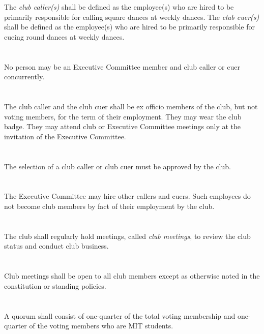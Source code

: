 \documentclass{bylaws}
\begin{document}
\section{}The \textit{club caller(s)} shall be defined as the employee(s) who are hired to be primarily responsible for calling square dances at weekly dances. The \textit{club cuer(s)} shall be defined as the employee(s) who are hired to be primarily responsible for cueing round dances at weekly dances.
\section{}No person may be an Executive Committee member and club caller or cuer concurrently.
\section{}The club caller and the club cuer shall be ex officio members of the club, but not voting members, for the term of their employment.  They may wear the club badge.  They may attend club or Executive Committee meetings only at the invitation of the Executive Committee.
\section{}The selection of a club caller or club cuer must be approved by the club.
\section{}The Executive Committee may hire other callers and cuers.  Such employees do not become club members by fact of their employment by the club.


\section{}The club shall regularly hold meetings, called \textit{club meetings}, to review the club status and conduct club business.
\section{}Club meetings shall be open to all club members except as otherwise noted in the constitution or standing policies.
\section{}A quorum shall consist of one-quarter of the total voting membership and one-quarter of the voting members who are MIT students.
\end{document}
